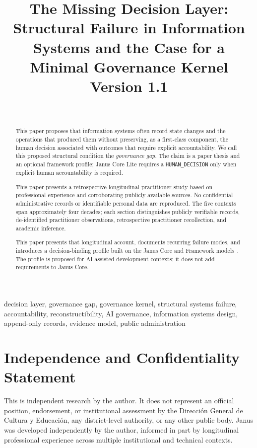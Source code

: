 \documentclass[conference]{IEEEtran}
\title{The Missing Decision Layer: Structural Failure in Information Systems and the Case for a Minimal Governance Kernel\\
\large Version 1.1}
\author{%
  \IEEEauthorblockN{Martín Nicolás Sánchez Morales}\\
  \IEEEauthorblockA{Janus Governance Project\\
  Buenos Aires, Argentina\\
  ORCID: \url{https://orcid.org/0009-0000-4963-8847}\\
  \url{https://janusgovernance.org}}%
}
\begin{document}
\maketitle

\begin{abstract}
This paper proposes that information systems often record state changes and the
operations that produced them without preserving, as a first-class component,
the human decision associated with outcomes that require explicit accountability.
We call this proposed structural condition the \emph{governance gap}. The claim
is a paper thesis and an optional framework profile; Janus Core Lite requires a
\texttt{HUMAN\_DECISION} only when explicit human accountability is required.

This paper presents a retrospective longitudinal practitioner study based on
professional experience and corroborating publicly available sources. No
confidential administrative records or identifiable personal data are
reproduced. The five contexts span approximately four decades; each section
distinguishes publicly verifiable records, de-identified practitioner
observations, retrospective practitioner recollection, and academic inference.

This paper presents that longitudinal account, documents recurring failure modes,
and introduces a decision-binding profile built on the Janus Core and Framework
models~\cite{sanchez_core,sanchez_framework}. The profile is proposed for
AI-assisted development contexts; it does not add requirements to Janus Core.
\end{abstract}

\begin{IEEEkeywords}
decision layer, governance gap, governance kernel, structural systems failure, accountability, reconstructibility, AI governance, information systems design, append-only records, evidence model, public administration
\end{IEEEkeywords}

\section*{Independence and Confidentiality Statement}

This is independent research by the author. It does not represent an official
position, endorsement, or institutional assessment by the Direcci\'on General
de Cultura y Educaci\'on, any district-level authority, or any other public
body. Janus was developed independently by the author, informed in part by
longitudinal professional experience across multiple institutional and
technical contexts.
\end{document}
